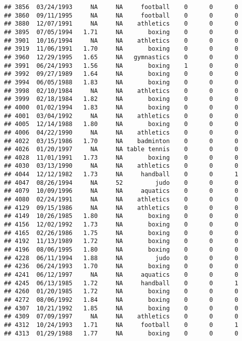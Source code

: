 \documentclass[]{article}
\begin{document}
\begin{verbatim}
## 3856  03/24/1993     NA     NA     football    0      0      0
## 3860  09/11/1995     NA     NA     football    0      0      0
## 3880  12/07/1991     NA     NA    athletics    0      0      0
## 3895  07/05/1994   1.71     NA       boxing    0      0      0
## 3901  10/16/1994     NA     NA    athletics    0      0      0
## 3919  11/06/1991   1.70     NA       boxing    0      0      0
## 3960  12/29/1995   1.65     NA   gymnastics    0      0      0
## 3991  06/24/1993   1.56     NA       boxing    1      0      0
## 3992  09/27/1989   1.64     NA       boxing    0      0      0
## 3994  06/05/1988   1.83     NA       boxing    0      0      0
## 3998  02/10/1984     NA     NA    athletics    0      0      0
## 3999  02/18/1984   1.82     NA       boxing    0      0      0
## 4000  01/02/1994   1.83     NA       boxing    0      0      0
## 4001  03/04/1992     NA     NA    athletics    0      0      0
## 4005  12/14/1988   1.80     NA       boxing    0      0      0
## 4006  04/22/1990     NA     NA    athletics    0      0      0
## 4022  03/15/1986   1.70     NA    badminton    0      0      0
## 4026  01/20/1997     NA     NA table tennis    0      0      0
## 4028  11/01/1991   1.73     NA       boxing    0      0      0
## 4030  03/13/1990     NA     NA    athletics    0      0      0
## 4044  12/12/1982   1.73     NA     handball    0      0      1
## 4047  08/26/1994     NA     52         judo    0      0      0
## 4079  10/09/1996     NA     NA     aquatics    0      0      0
## 4080  02/24/1991     NA     NA    athletics    0      0      0
## 4129  09/15/1986     NA     NA    athletics    0      0      0
## 4149  10/26/1985   1.80     NA       boxing    0      0      0
## 4156  12/02/1992   1.73     NA       boxing    0      0      0
## 4165  02/26/1986   1.75     NA       boxing    0      0      0
## 4192  11/13/1989   1.72     NA       boxing    0      0      0
## 4196  08/06/1995   1.80     NA       boxing    0      0      0
## 4228  06/11/1994   1.88     NA         judo    0      0      0
## 4236  06/24/1993   1.70     NA       boxing    0      0      0
## 4241  06/12/1997     NA     NA     aquatics    0      0      0
## 4245  06/13/1985   1.72     NA     handball    0      0      1
## 4260  01/20/1985   1.72     NA       boxing    0      0      0
## 4272  08/06/1992   1.84     NA       boxing    0      0      0
## 4307  10/21/1992   1.85     NA       boxing    0      0      0
## 4309  07/09/1997     NA     NA    athletics    0      0      0
## 4312  10/24/1993   1.71     NA     football    0      0      1
## 4313  01/29/1988   1.77     NA       boxing    0      0      0

\end{verbatim}
\end{document}
